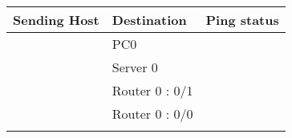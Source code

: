 \documentclass[a4paper,11pt]{article}
\begin{document}
\begin{enumerate}
\begin{enumerate}




                    \begin{table}[H]
                        \centering
                        \begin{tabular}{| m{9em}| m{12em}| m{9em} |}
                            \hline
                            {\cellcolor[rgb]{0.333,0.686,1}}\textbf{Sending Host}           & \textbf{Destination} & \textbf{Ping status}                                                                      \\
                            \hline
                            {\cellcolor[rgb]{0.333,0.686,1}}                                & PC0                  & {\cellcolor[rgb]{1,0.173,0.09}}                                                           \\
                            \hhline{|>{\arrayrulecolor[rgb]{0.333,0.686,1}}->{\arrayrulecolor{black}}->{\arrayrulecolor[rgb]{1,0.173,0.09}}->{\arrayrulecolor{black}}|}
                            {\cellcolor[rgb]{0.333,0.686,1}}                                & Server 0             & {\cellcolor[rgb]{1,0.173,0.09}}                                                           \\
                            \hhline{|>{\arrayrulecolor[rgb]{0.333,0.686,1}}->{\arrayrulecolor{black}}->{\arrayrulecolor[rgb]{1,0.173,0.09}}->{\arrayrulecolor{black}}|}
                            {\cellcolor[rgb]{0.333,0.686,1}}                                & Router 0 : 0/1       & {\cellcolor[rgb]{1,0.173,0.09}}                                                           \\
                            \hhline{|>{\arrayrulecolor[rgb]{0.333,0.686,1}}->{\arrayrulecolor{black}}->{\arrayrulecolor[rgb]{1,0.173,0.09}}->{\arrayrulecolor{black}}|}
                            {\cellcolor[rgb]{0.333,0.686,1}}                                & Router 0 : 0/0       & {\cellcolor[rgb]{1,0.173,0.09}}                                                           \\
                            \hhline{|>{\arrayrulecolor[rgb]{0.333,0.686,1}}->{\arrayrulecolor{black}}->{\arrayrulecolor[rgb]{1,0.173,0.09}}->{\arrayrulecolor{black}}|}

\end{tabular}
\end{table}
\end{enumerate}
\end{enumerate}
\end{document}
